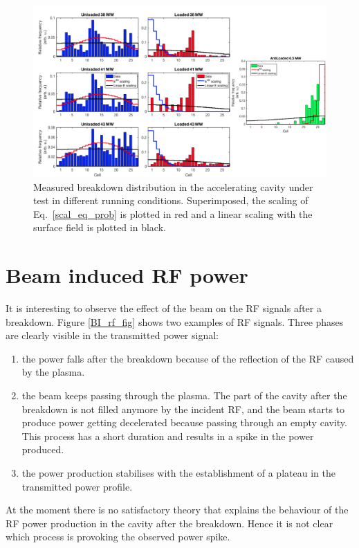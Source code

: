 \begin{landscape}

\begin{figure}[p]
\centering 
\includegraphics[scale=0.53]{pictures/distro_all.png}
\caption{Measured breakdown distribution in the accelerating cavity under test in different running conditions. Superimposed, the scaling of Eq.~\ref{scal_eq_prob} is plotted in red and a linear scaling with the surface field is plotted in black.}
\label{BD_distro}
\end{figure}
 
\end{landscape}







\newpage
\section[Beam induced RF power]{Beam induced RF power}

It is interesting to observe the effect of the beam on the RF signals after a breakdown. Figure \ref{BI_rf_fig}  shows two examples of RF signals. Three phases are clearly visible in the transmitted power signal: 
\begin{enumerate}
\item the power falls after the breakdown because of the reflection of the RF caused by the plasma.
\item the beam keeps passing through the plasma. The part of the cavity after the breakdown is not filled anymore by the incident RF, and the beam starts to produce power getting decelerated because passing through an empty cavity. This process has a short duration and results in a spike in the power produced. 
\item the power production stabilises with the establishment of a plateau in the transmitted power profile.
\end{enumerate}
At the moment there is no satisfactory theory that explains the behaviour of the RF power production in the cavity after the breakdown. Hence it is not clear which process is provoking the observed power spike.

